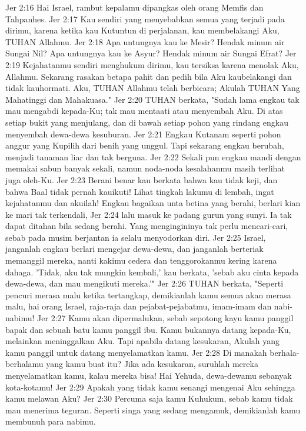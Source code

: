 Jer 2:16  Hai Israel, rambut kepalamu dipangkas oleh orang Memfis dan Tahpanhes.
Jer 2:17  Kau sendiri yang menyebabkan semua yang terjadi pada dirimu, karena ketika kau Kutuntun di perjalanan, kau membelakangi Aku, TUHAN Allahmu.
Jer 2:18  Apa untungnya kau ke Mesir? Hendak minum air Sungai Nil? Apa untungnya kau ke Asyur? Hendak minum air Sungai Efrat?
Jer 2:19  Kejahatanmu sendiri menghukum dirimu, kau tersiksa karena menolak Aku, Allahmu. Sekarang rasakan betapa pahit dan pedih bila Aku kaubelakangi dan tidak kauhormati. Aku, TUHAN Allahmu telah berbicara; Akulah TUHAN Yang Mahatinggi dan Mahakuasa."
Jer 2:20  TUHAN berkata, "Sudah lama engkau tak mau mengabdi kepada-Ku; tak mau mentaati atau menyembah Aku. Di atas setiap bukit yang menjulang, dan di bawah setiap pohon yang rindang engkau menyembah dewa-dewa kesuburan.
Jer 2:21  Engkau Kutanam seperti pohon anggur yang Kupilih dari benih yang unggul. Tapi sekarang engkau berubah, menjadi tanaman liar dan tak berguna.
Jer 2:22  Sekali pun engkau mandi dengan memakai sabun banyak sekali, namun noda-noda kesalahanmu masih terlihat juga oleh-Ku.
Jer 2:23  Berani benar kau berkata bahwa kau tidak keji, dan bahwa Baal tidak pernah kauikuti! Lihat tingkah lakumu di lembah, ingat kejahatanmu dan akuilah! Engkau bagaikan unta betina yang berahi, berlari kian ke mari tak terkendali,
Jer 2:24  lalu masuk ke padang gurun yang sunyi. Ia tak dapat ditahan bila sedang berahi. Yang mengingininya tak perlu mencari-cari, sebab pada musim berjantan ia selalu menyodorkan diri.
Jer 2:25  Israel, janganlah engkau berlari mengejar dewa-dewa, dan janganlah berteriak memanggil mereka, nanti kakimu cedera dan tenggorokanmu kering karena dahaga. 'Tidak, aku tak mungkin kembali,' kau berkata, 'sebab aku cinta kepada dewa-dewa, dan mau mengikuti mereka.'"
Jer 2:26  TUHAN berkata, "Seperti pencuri merasa malu ketika tertangkap, demikianlah kamu semua akan merasa malu, hai orang Israel, raja-raja dan pejabat-pejabatmu, imam-imam dan nabi-nabimu!
Jer 2:27  Kamu akan dipermalukan, sebab sepotong kayu kamu panggil bapak dan sebuah batu kamu panggil ibu. Kamu bukannya datang kepada-Ku, melainkan meninggalkan Aku. Tapi apabila datang kesukaran, Akulah yang kamu panggil untuk datang menyelamatkan kamu.
Jer 2:28  Di manakah berhala-berhalamu yang kamu buat itu? Jika ada kesukaran, suruhlah mereka menyelamatkan kamu, kalau mereka bisa! Hai Yehuda, dewa-dewamu sebanyak kota-kotamu!
Jer 2:29  Apakah yang tidak kamu senangi mengenai Aku sehingga kamu melawan Aku?
Jer 2:30  Percuma saja kamu Kuhukum, sebab kamu tidak mau menerima teguran. Seperti singa yang sedang mengamuk, demikianlah kamu membunuh para nabimu.
